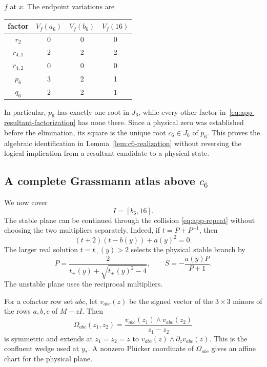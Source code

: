 \(f\) at \(x\). The endpoint variations are
\begin{center}
\begin{tabular}{c@{\qquad}ccc}
\toprule
factor & \(V_f(a_6)\) & \(V_f(b_6)\) & \(V_f(16)\)\\
\midrule
\(r_2\)     &0&0&0\\
\(r_{4,1}\)&2&2&2\\
\(r_{4,2}\)&0&0&0\\
\(p_6\)     &3&2&1\\
\(q_6\)     &2&2&1\\
\bottomrule
\end{tabular}
\end{center}
In particular, \(p_6\) has exactly one root in \(J_6\), while every other
factor in~\eqref{eq:app-resultant-factorization} has none there.  Since a
physical zero was established before the elimination, its square is the
unique root \(c_6\in J_6\) of \(p_6\).  This proves the algebraic
identification in Lemma~\ref{lem:c6-realization} without reversing the
logical implication from a resultant candidate to a physical state.

\subsection{A complete Grassmann atlas above \texorpdfstring{\(c_6\)}{c6}}
\label{appsubsec:g6-atlas}

We now cover
\[
 I=[b_6,16].
\]
The stable plane can be continued through the collision
\eqref{eq:app-repeat} without choosing the two multipliers separately.
Indeed, if \(t=P+P^{-1}\), then
\begin{equation}
 (t+2)(t-b(y))+a(y)^2=0.                              \label{eq:app-t-equation}
\end{equation}
The larger real solution \(t=t_+(y)>2\) selects the physical stable branch
by
\begin{equation}
 P=\frac{2}{t_+(y)+\sqrt{t_+(y)^2-4}},
 \qquad S=-\frac{a(y)P}{P+1}.                         \label{eq:app-SP-branch}
\end{equation}
The unstable plane uses the reciprocal multipliers.

For a cofactor row set \(abc\), let \(v_{abc}(z)\) be the signed vector of
the \(3\times3\) minors of the rows \(a,b,c\) of \(M-zI\).  Then
\[
 \Omega_{abc}(z_1,z_2)
 =\frac{v_{abc}(z_1)\wedge v_{abc}(z_2)}{z_1-z_2}
\]
is symmetric and extends at \(z_1=z_2=z\) to
\(v_{abc}(z)\wedge\partial_zv_{abc}(z)\).  This is the confluent wedge used
at \(y_*\).  A nonzero Pl\"ucker coordinate of \(\Omega_{abc}\) gives an
affine chart for the physical plane.

